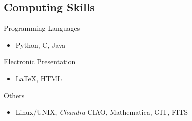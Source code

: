 \documentclass{res}
\begin{document}
\begin{resume}
\section{\textbf{Computing Skills}}
\vspace{.1in}
Programming Languages
\begin{itemize}
\item[] Python, C, Java
\end{itemize}
Electronic Presentation
\begin{itemize}
\item[] \LaTeX, HTML
\end{itemize}
Others
\begin{itemize}
\item[] Linux/UNIX, \textit{Chandra} CIAO, Mathematica, GIT, FITS
\end{itemize}

\end{resume} 
\end{document}
